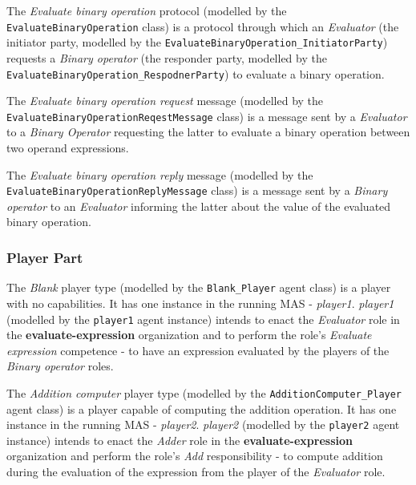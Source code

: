 The \textit{Evaluate binary operation} protocol (modelled by the \texttt{EvaluateBinaryOperation} class) is a protocol through which an \textit{Evaluator} (the initiator party, modelled by the \texttt{EvaluateBinaryOperation\_InitiatorParty}) requests a \textit{Binary operator} (the responder party, modelled by the \texttt{EvaluateBinaryOperation\_RespodnerParty}) to evaluate a binary operation.

The \textit{Evaluate binary operation request} message (modelled by the \texttt{EvaluateBinaryOperationReqestMessage} class) is a message sent by a \textit{Evaluator} to a \textit{Binary Operator} requesting the latter to evaluate a binary operation between two operand expressions.

The \textit{Evaluate binary operation reply} message (modelled by the \texttt{EvaluateBinaryOperationReplyMessage} class) is a message sent by a \textit{Binary operator} to an \textit{Evaluator} informing the latter about the value of the evaluated binary operation.

\subsubsection*{Player Part}

The \textit{Blank} player type (modelled by the \texttt{Blank\_Player} agent class) is a player with no capabilities.
It has one instance in the running MAS - \textit{player1}.
\textit{player1} (modelled by the \texttt{player1} agent instance) intends to enact the \textit{Evaluator} role in the \textbf{evaluate-expression} organization and to perform the role's \textit{Evaluate expression} competence - to have an expression evaluated by the players of the \textit{Binary operator} roles.

The \textit{Addition computer} player type (modelled by the \texttt{AdditionComputer\_Player} agent class) is a player capable of computing the addition operation.
It has one instance in the running MAS - \textit{player2}.
\textit{player2} (modelled by the \texttt{player2} agent instance) intends to enact the \textit{Adder} role in the \textbf{evaluate-expression} organization and perform the role's \textit{Add} responsibility - to compute addition during the evaluation of the expression from the player of the \textit{Evaluator} role.

